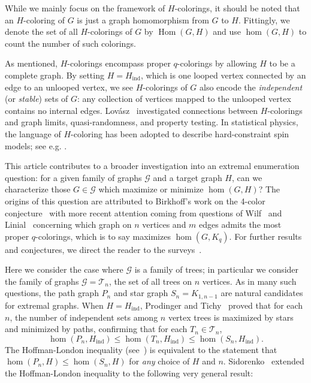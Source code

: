 \documentclass[11pt]{article}
\theoremstyle{definition}
\DeclareMathOperator{\Hom}{Hom}
\DeclareMathOperator{\ind}{ind}
\begin{document}
While we mainly focus on the framework of $H$-colorings, it should be noted that an $H$-coloring of $G$ is just a graph homomorphism from $G$ to $H$. Fittingly, we denote the set of all $H$-colorings of $G$ by $\Hom(G,H)$ and use $\hom(G,H)$ to count the number of such colorings. 

As mentioned, $H$-colorings encompass proper $q$-colorings by allowing $H$ to be a complete graph. By setting $H = H_{\ind}$, which is one looped vertex connected by an edge to an unlooped vertex, we see $H$-colorings of $G$ also encode the \emph{independent} (or \emph{stable}) sets of $G$: any collection of vertices mapped to the unlooped vertex contains no internal edges. Lov\'asz~\cite{Lovasz2012} investigated connections between $H$-colorings and graph limits, quasi-randomness, and property testing. In statistical physics, the language of $H$-coloring has been adopted to describe hard-constraint spin models; see e.g. \cite{BrightwellWinkler1999, BrightwellWinkler2002}.

This article contributes to a broader investigation into an extremal enumeration question: for a given family of graphs $\mathcal{G}$ and a target graph $H$, can we characterize those $G \in \mathcal{G}$ which maximize or minimize $\hom(G,H)$? The origins of this question are attributed to Birkhoff's work on the 4-color conjecture~\cite{Birkhoff1912, BirkhoffLewis1946} with more recent attention coming from questions of Wilf~\cite{Wilf1984} and Linial~\cite{Linial1986} concerning which graph on $n$ vertices and $m$ edges admits the most proper $q$-colorings, which is to say maximizes $\hom(G,K_q)$. For further results and conjectures, we direct the reader to the surveys~\cite{Cutler2012, Zhao2017}.

Here we consider the case where $\mathcal{G}$ is a family of trees; in particular we consider the family of graphs $\mathcal{G} = \mathcal{T}_n$, the set of all trees on $n$ vertices. As in many such questions, the path graph $P_n$ and star graph $S_n = K_{1,n-1}$ are natural candidates for extremal graphs. When $H = H_{\ind}$, Prodinger and Tichy~\cite{ProdingerTichy1982} proved that for each $n$, the number of independent sets among $n$ vertex trees is maximized by stars and minimized by paths, confirming that for each $T_n \in \mathcal{T}_n$,
\begin{equation} \label{inq:PT}
\hom(P_n, H_{\ind}) \le \hom(T_n, H_{\ind}) \le \hom(S_n, H_{\ind}).
\end{equation}
The Hoffman-London inequality (see~\cite{Hoffman1967,London1966,Sidorenko1985}) is equivalent to the statement that $\hom(P_n,H) \le \hom(S_n,H)$ for \emph{any} choice of $H$ and $n$. Sidorenko~\cite{Sidorenko1994} extended the Hoffman-London inequality to the following very general result:
\end{document}
